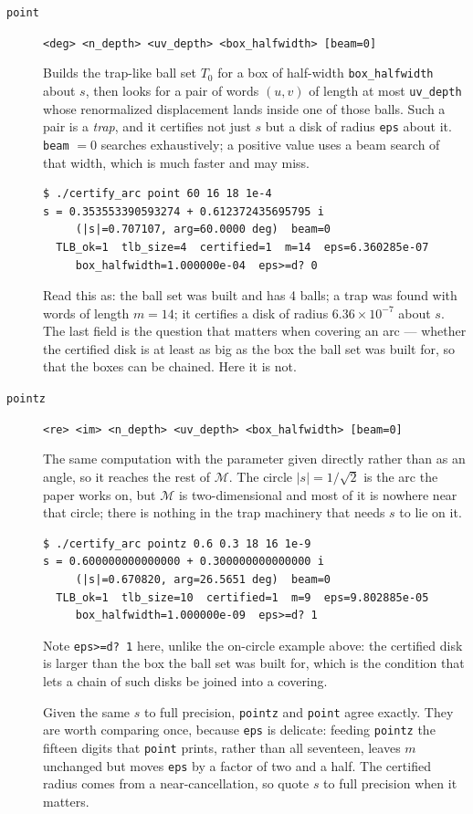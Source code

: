 \documentclass{amsart}
\begin{document}
\begin{description}
\item[\texttt{point}] \texttt{<deg> <n\_depth> <uv\_depth> <box\_halfwidth> [beam=0]}


Builds the trap-like ball set $T_0$ for a box of half-width \texttt{box\_halfwidth} about $s$,
then looks for a pair of words $(u,v)$ of length at most \texttt{uv\_depth} whose renormalized
displacement lands inside one of those balls.  Such a pair is a \emph{trap}, and it certifies not
just $s$ but a disk of radius \texttt{eps} about it.  \texttt{beam} $= 0$ searches exhaustively;
a positive value uses a beam search of that width, which is much faster and may miss.
\begin{verbatim}
$ ./certify_arc point 60 16 18 1e-4
s = 0.353553390593274 + 0.612372435695795 i
     (|s|=0.707107, arg=60.0000 deg)  beam=0
  TLB_ok=1  tlb_size=4  certified=1  m=14  eps=6.360285e-07
     box_halfwidth=1.000000e-04  eps>=d? 0
\end{verbatim}
Read this as: the ball set was built and has 4 balls; a trap was found with words of length
$m = 14$; it certifies a disk of radius $6.36 \times 10^{-7}$ about $s$.  The last field is the
question that matters when covering an arc --- whether the certified disk is at least as big as
the box the ball set was built for, so that the boxes can be chained.  Here it is not.
\item[\texttt{pointz}] \texttt{<re> <im> <n\_depth> <uv\_depth> <box\_halfwidth> [beam=0]}

The same computation with the parameter given directly rather than as an angle, so it
reaches the rest of $\mathcal{M}$.  The circle $|s| = 1/\sqrt2$ is the arc the paper works
on, but $\mathcal{M}$ is two-dimensional and most of it is nowhere near that circle; there
is nothing in the trap machinery that needs $s$ to lie on it.
\begin{verbatim}
$ ./certify_arc pointz 0.6 0.3 18 16 1e-9
s = 0.600000000000000 + 0.300000000000000 i
     (|s|=0.670820, arg=26.5651 deg)  beam=0
  TLB_ok=1  tlb_size=10  certified=1  m=9  eps=9.802885e-05
     box_halfwidth=1.000000e-09  eps>=d? 1
\end{verbatim}
Note \texttt{eps>=d? 1} here, unlike the on-circle example above: the certified disk is
larger than the box the ball set was built for, which is the condition that lets a chain of
such disks be joined into a covering.

Given the same $s$ to full precision, \texttt{pointz} and \texttt{point} agree exactly.
They are worth comparing once, because \texttt{eps} is delicate: feeding \texttt{pointz}
the fifteen digits that \texttt{point} prints, rather than all seventeen, leaves $m$
unchanged but moves \texttt{eps} by a factor of two and a half.  The certified radius comes
from a near-cancellation, so quote $s$ to full precision when it matters.


\end{description}
\end{document}
